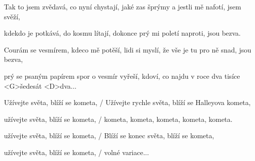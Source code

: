 \zr\kr

\zs
Tak to jsem zvědavá, co nyní chystají, jaké zas šprýmy a jestli mě nafotí, jsem svěží,

kdekdo je potkává, do kosmu lítají, dokonce prý mi poletí naproti, jsou bezva.

Courám se vesmírem, kdeco mě potěší, lidi si myslí, že vše je tu pro ně snad, jsou bezva,

prý se psaným papírem spor o vesmír vyřeší, kdoví, co najdu v roce dva tisíce <G>šedesát <D>dva...
\ks

\zr
Užívejte světa, blíží se kometa, / Užívejte rychle světa, blíží se Halleyova kometa,

užívejte světa, blíží se kometa, / kometa, kometa, kometa, kometa, kometa.

užívejte světa, blíží se kometa, / Blíží se konec světa, blíží se kometa,

užívejte světa, blíží se kometa, / volné variace...
\kr

\kp
